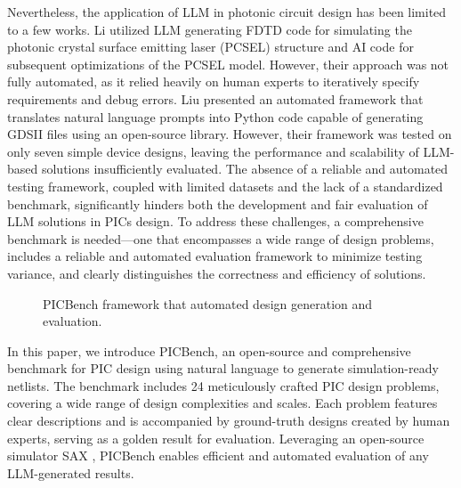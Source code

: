 Nevertheless, the application of LLM in photonic circuit design has been limited to a few works. 
Li \etal \cite{li2023english} utilized LLM generating FDTD code for simulating the photonic crystal surface emitting laser (PCSEL) structure and AI code for subsequent optimizations of the PCSEL model. 
However, their approach was not fully automated, as it relied heavily on human experts to iteratively specify requirements and debug errors.
Liu \etal \cite{liu2024towards} presented an automated framework that translates natural language prompts into Python code capable of generating GDSII files using an open-source library. 
However, their framework was tested on only seven simple device designs, leaving the performance and scalability of LLM-based solutions insufficiently evaluated. 
The absence of a reliable and automated testing framework, coupled with limited datasets and the lack of a standardized benchmark, significantly hinders both the development and fair evaluation of LLM solutions in PICs design. 
To address these challenges, a comprehensive benchmark is needed—one that encompasses a wide range of design problems, includes a reliable and automated evaluation framework to minimize testing variance, and clearly distinguishes the correctness and efficiency of solutions.

\begin{figure}[!tb]
    \centering
      \caption{PICBench framework that automated design generation and evaluation.}
      \label{fig:flow}
\end{figure}


In this paper, we introduce PICBench, an open-source and comprehensive benchmark for PIC design using natural language to generate simulation-ready netlists.
The benchmark includes 24 meticulously crafted PIC design problems, covering a wide range of design complexities and scales. 
Each problem features clear descriptions and is accompanied by ground-truth designs created by human experts, serving as a golden result for evaluation.
Leveraging an open-source simulator SAX \cite{sax2023}, PICBench enables efficient and automated evaluation of any LLM-generated results.

